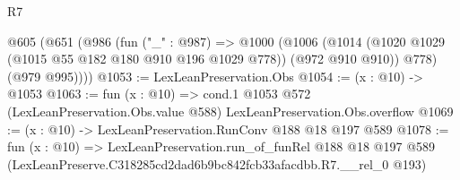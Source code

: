 \begin{lexlean}{R7}
\begin{coremodule}
  @605
    (@651
      (@986
        (fun ("_" : @987) =>
        @1000
          (@1006
            (@1014 (@1020 @1029 (@1015 @55 @182 @180 @910 @196 @1029 @778)) (@972 @910 @910))
            @778)
          (@979 @995))))
@1053 := LexLeanPreservation.Obs
@1054 := (x : @10) -> @1053
@1063 := fun (x : @10) =>
  cond.{1} @1053 @572 (LexLeanPreservation.Obs.value @588) LexLeanPreservation.Obs.overflow
@1069 := (x : @10) -> LexLeanPreservation.RunConv @188 @18 @197 @589
@1078 := fun (x : @10) =>
  LexLeanPreservation.run_of_funRel
    @188
    @18
    @197
    @589
    (LexLeanPreserve.C318285cd2dad6b9bc842fcb33afacdbb.R7.__rel_0 @193)
\end{coremodule}
\end{lexlean}

